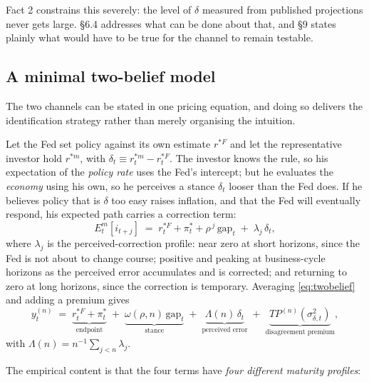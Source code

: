\documentclass[11pt]{article}
\begin{document}
Fact 2 constrains this severely: the level of $\delta$ measured from published projections
never gets large. \S6.4 addresses what can be done about that, and \S9 states plainly what
would have to be true for the channel to remain testable.

\subsection{A minimal two-belief model}

The two channels can be stated in one pricing equation, and doing so delivers the
identification strategy rather than merely organising the intuition.

Let the Fed set policy against its own estimate $r^{*F}$ and let the representative investor
hold $r^{*m}$, with $\delta_t \equiv r^{*m}_t - r^{*F}_t$. The investor knows the rule, so his
expectation of the \emph{policy rate} uses the Fed's intercept; but he evaluates the
\emph{economy} using his own, so he perceives a stance $\delta_t$ looser than the Fed does.
If he believes policy that is $\delta$ too easy raises inflation, and that the Fed will
eventually respond, his expected path carries a correction term:
\begin{equation}
E^{m}_t\!\left[i_{t+j}\right] \;=\; r^{*F}_t + \pi^{*}_t + \rho^{\,j}\,\text{gap}_t \;+\; \lambda_j\,\delta_t ,
\label{eq:twobelief}
\end{equation}
where $\lambda_j$ is the perceived-correction profile: near zero at short horizons, since the
Fed is not about to change course; positive and peaking at business-cycle horizons as the
perceived error accumulates and is corrected; and returning to zero at long horizons, since the
correction is temporary. Averaging \eqref{eq:twobelief} and adding a premium gives
\begin{equation}
y^{(n)}_t \;=\; \underbrace{r^{*F}_t + \pi^{*}_t}_{\text{endpoint}} \;+\; \underbrace{\omega(\rho,n)\,\text{gap}_t}_{\text{stance}} \;+\; \underbrace{\Lambda(n)\,\delta_t}_{\text{perceived error}} \;+\; \underbrace{TP^{(n)}\!\left(\sigma^2_{\delta,t}\right)}_{\text{disagreement premium}} ,
\label{eq:pricing}
\end{equation}
with $\Lambda(n) = n^{-1}\sum_{j<n}\lambda_j$.

The empirical content is that the four terms have \emph{four different maturity profiles}:
\end{document}
